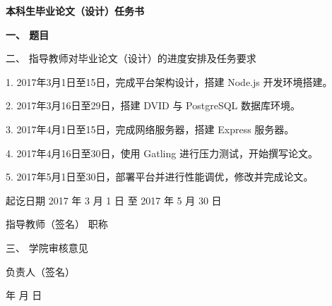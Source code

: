{
  \setlength{\parindent}{0em}
  \linespread{1}

  \vspace*{-2.2em}

  {
    \centering
    \songti\erhao\bfseries
    本科生毕业论文（设计）任务书 \par
  }

  \vspace{2.1em}

  {
    \renewcommand\arraystretch{1.7}
    \songti\xiaosi\bfseries
    一、 \; 题目 \; \underline{\makebox{\zjutitlec}}

    \vspace{1.1em}

    二、 \; 指导教师对毕业论文（设计）的进度安排及任务要求
    {

      \vspace{0.5em}
      \songti\xiaosi\mdseries

      1. 2017年3月1日至15日，完成平台架构设计，搭建 Node.js 开发环境搭建。

      2. 2017年3月16日至29日，搭建 DVID 与 PostgreSQL 数据库环境。

      3. 2017年4月1日至15日，完成网络服务器，搭建 Express 服务器。

      4. 2017年4月16日至30日，使用 Gatling 进行压力测试，开始撰写论文。

      5. 2017年5月1日至30日，部署平台并进行性能调优，修改并完成论文。
    }
    \vspace{2em}

    \hfill 起讫日期 \hspace{1em} 2017 年 \hspace{0.5em} 3 月 \hspace{0.5em} 1 日 \; 至 \hspace{0.5em} 2017 年 \hspace{0.5em} 5 月 \hspace{0.5em} 30 日

    \vspace{1.3em}

    \hfill 指导教师（签名） \; \underline{\hspace{4em}} \; 职称 \; \underline{\hspace{4em}}

    \vspace{2.35em}

    三、 \; 学院审核意见

    \vspace{13.95em}

    \hfill 负责人（签名） \; \underline{\hspace{4em}}

    \vspace{1.3em}

    \hfill \hspace{2em} 年 \hspace{1em} 月 \hspace{1em} 日 \par
  }
}
